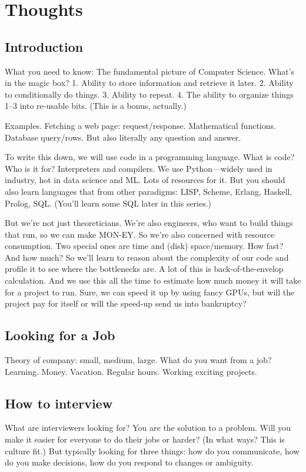 \chapter{Thoughts}

\section{Introduction}
What you need to know: The fundamental picture of Computer Science. What's in the magic box? 1. Ability to store information and retrieve it later. 2. Ability to conditionally do things. 3. Ability to repeat. 4. The ability to organize things 1--3 into re-usable bits. (This is a bonus, actually.)

Examples. Fetching a web page: request/response. Mathematical functions. Database query/rows. But also literally any question and answer.

To write this down, we will use code in a programming language. What is code? Who is it for? Interpreters and compilers. We use Python---widely used in industry, hot in data science and ML. Lots of resources for it. But you should also learn languages that from other paradigms: LISP, Scheme, Erlang, Haskell, Prolog, SQL. (You'll learn some SQL later in this series.)

But we're not just theoreticians. We're also engineers, who want to build things that run, so we can make MON-EY. So we're also concerned with resource consumption. Two special ones are time and (disk) space/memory. How fast? And how much? So we'll learn to reason about the complexity of our code and profile it to see where the bottlenecks are. A lot of this is back-of-the-envelop calculation. And we use this all the time to estimate how much money it will take for a project to run. Sure, we can speed it up by using fancy GPUs, but will the project pay for itself or will the speed-up send us into bankruptcy?

\section{}

\section{Looking for a Job}
Theory of company: small, medium, large. What do you want from a job? Learning. Money. Vacation. Regular hours. Working exciting projects.

\section{How to interview} What are interviewers looking for? You are the solution to a problem. Will you make it easier for everyone to do their jobs or harder? (In what ways? This is culture fit.) But typically looking for three things: how do you communicate, how do you make decisions, how do you respond to changes or ambiguity.
